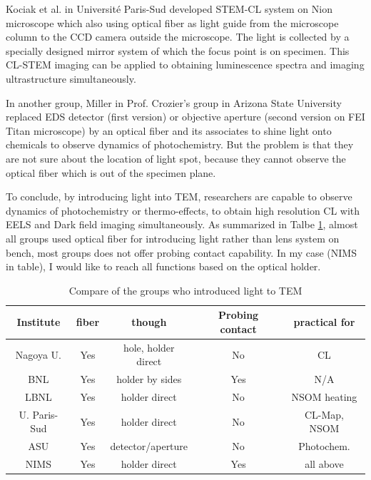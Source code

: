 Kociak et al. in Université Paris-Sud \cite{Zagonel2011} developed STEM-CL system on Nion microscope which also using optical fiber as light guide from the microscope column to the CCD camera outside the microscope. The light is collected by a specially designed mirror system of which the focus point is on specimen. This CL-STEM imaging can be applied to obtaining luminescence spectra and imaging ultrastructure simultaneously.\cite{DOI: 10.1039/c6nr01908k}

In another group, Miller in Prof. Crozier's group in Arizona State University replaced EDS detector (first version) or objective aperture (second version on FEI Titan microscope) by an optical fiber and its associates to shine light onto chemicals to observe dynamics of photochemistry.\cite{Miller2012} But the problem is that they are not sure about the location of light spot, because they cannot observe the optical fiber which is out of the specimen plane. 

To conclude, by introducing light into TEM, researchers are capable to observe dynamics of photochemistry or thermo-effects, to obtain high resolution CL with EELS and Dark field imaging simultaneously. As summarized in Talbe \ref{table2.2}, almost all groups used optical fiber for introducing light rather than lens system on bench, most groups does not offer probing contact capability. In my case (NIMS in table), I would like to reach all functions based on the optical holder. 

\begin{table}[ht]
\centering 
\begin{tabular}{|c|c|c|c|c|} 
\hline 
Institute & fiber & though & Probing contact & practical for\\ [0.5ex] 
\hline 
Nagoya U. & Yes & hole, holder direct & No & CL\\[1.5ex] 
BNL & Yes & holder by sides & Yes & N/A\\[1.5ex]
LBNL & Yes& holder direct & No & NSOM heating\\[1.5ex]
U. Paris-Sud & Yes & holder direct & No & CL-Map, NSOM\\[1.5ex]
ASU & Yes & detector/aperture & No & Photochem.\\[1.5ex]
NIMS & Yes & holder direct & Yes & all above\\
\hline
\end{tabular}
\caption{Compare of the groups who introduced light to TEM} 
\label{table2.2} 
\end{table}

